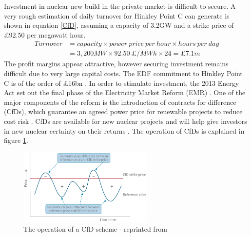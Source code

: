 Investment in nuclear new build in the private market is difficult to secure.
A very rough estimation of daily turnover for Hinkley Point C can generate is shown in equation \ref{CfD}, assuming a capacity of 3.2GW and a strike price of \pounds92.50 per megawatt hour.
\begin{equation}
\begin{split}
\label{CfD}
Turnover &= capacity \times power~price~per~hour \times hours~per~day\\
               &= 3,200MW \times 92.50~\pounds/MWh \times 24 = \pounds7.1m
\end{split}
\end{equation}
The profit margins appear attractive, however securing investment remains difficult due to very large capital costs.
The EDF commitment to Hinkley Point C is of the order of \pounds16bn \cite{Spectator14}.
In order to stimulate investment, the 2013 Energy Act set out the final phase of the Electricity Market Reform (EMR) \cite{EnergyAct13}.
One of the major components of the reform is the introduction of contracts for difference (CfDs), which guarantee an agreed power price for renewable projects to reduce cost risk \cite{Baringa}.
CfDs are available for new nuclear projects and will help give investors in new nuclear certainty on their returns \cite{Baringa}.
The operation of CfDs is explained in figure \ref{figure:CfD}.

\begin{figure}[!h]
\centering
\includegraphics[width = 0.6\textwidth]{Figures/StrikePrice.jpg}
\caption{The operation of a CfD scheme - reprinted from \cite{Baringa}}
\label{figure:CfD}
\end{figure}

